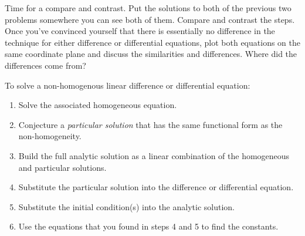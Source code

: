 \begin{problem}
    Time for a compare and contrast.  Put the solutions to both of the previous two
    problems somewhere you can see both of them.  Compare and contrast the steps.  Once
    you've convinced yourself that there is essentially no difference in the technique for
    either difference or differential equations, plot both equations on the same
    coordinate plane and discuss the similarities and differences. Where did the
    differences come from? 
\end{problem}


\begin{technique}
    To solve a non-homogenous linear difference or differential equation:
    \begin{enumerate}
        \item Solve the associated homogeneous equation.
        \item Conjecture a {\it particular solution} that has the same functional form as
            the non-homogeneity.
        \item Build the full analytic solution as a linear combination of the homogeneous and
            particular solutions.
        \item Substitute the particular solution into the difference or differential equation.
        \item Substitute the initial condition(s) into the analytic solution.
        \item Use the equations that you found in steps 4 and 5 to find the constants.
    \end{enumerate}
\end{technique}

